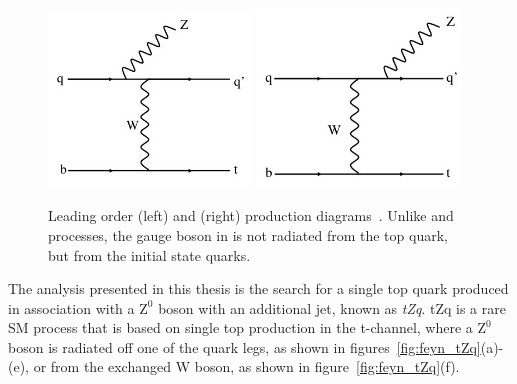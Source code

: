 \begin{figure}[p]
\centering
\includegraphics[width=0.48\textwidth]{figs/top-physics/tZq_feyn1.jpg}
\includegraphics[width=0.48\textwidth]{figs/top-physics/tZq_feyn2.jpg}
\caption{Leading order \ttZ (left) and \ttW (right) production diagrams~\cite{Khachatryan:2014ewa}. Unlike \ttZ and \ttH processes, the gauge boson in \ttW is not radiated from the top quark, but from the initial state quarks.}
\label{fig:deyn_ttV}
\end{figure}

The analysis presented in this thesis is the search for a single top quark produced in association with a $\text{Z}^0$ boson with an additional jet, known as \emph{tZq}.
tZq is a rare SM process that is based on single top production in the t-channel, where a $\text{Z}^0$ boson is radiated off one of the quark legs, as shown in figures~\ref{fig:feyn_tZq}(a)-(e), or from the exchanged W boson, as shown in figure~\ref{fig:feyn_tZq}(f).

